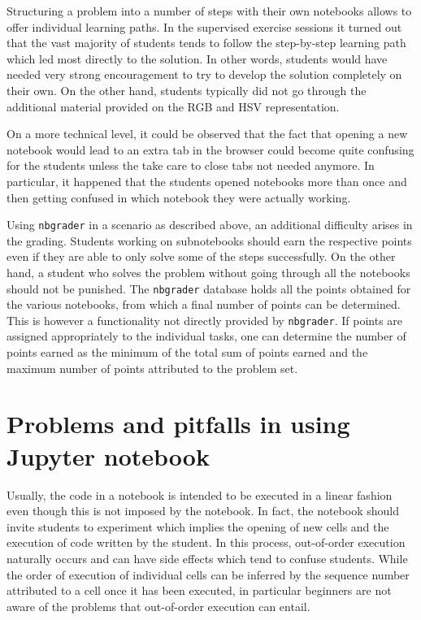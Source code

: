 \documentclass[twocolumn]{svjour3}          %
\begin{document}
Structuring a problem into a number of steps with their own notebooks allows to
offer individual learning paths. In the supervised exercise sessions it turned
out that the vast majority of students tends to follow the step-by-step
learning path which led most directly to the solution. In other words, students
would have needed very strong encouragement to try to develop the solution
completely on their own. On the other hand, students typically did not go through
the additional material provided on the RGB and HSV representation.

On a more technical level, it could be observed that the fact that opening a
new notebook would lead to an extra tab in the browser could become quite
confusing for the students unless the take care to close tabs not needed
anymore. In particular, it happened that the students opened notebooks more
than once and then getting confused in which notebook they were actually
working.

Using \texttt{nbgrader} in a scenario as described above, an additional
difficulty arises in the grading. Students working on subnotebooks should earn
the respective points even if they are able to only solve some of the steps
successfully. On the other hand, a student who solves the problem without going
through all the notebooks should not be punished. The \texttt{nbgrader}
database holds all the points obtained for the various notebooks, from which a
final number of points can be determined. This is however a functionality not
directly provided by \texttt{nbgrader}. If points are assigned appropriately to
the individual tasks, one can determine the number of points earned as the
minimum of the total sum of points earned and the maximum number of points
attributed to the problem set.


\section{Problems and pitfalls in using Jupyter notebook}
Usually, the code in a notebook is intended to be executed in a linear
fashion even though this is not imposed by the notebook. In fact, the
notebook should invite students to experiment which implies the
opening of new cells and the execution of code written by the
student. In this process, out-of-order execution naturally occurs and
can have side effects which tend to confuse students. While the order
of execution of individual cells can be inferred by the sequence
number attributed to a cell once it has been executed, in particular
beginners are not aware of the problems that out-of-order execution
can entail.
\end{document}
